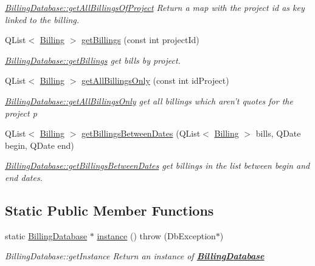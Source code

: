 \begin{DoxyCompactItemize}
\begin{DoxyCompactList}\small\item\em \hyperlink{classDatabases_1_1BillingDatabase_a44c3e09fbb7d540579f4cceae4d6901f}{Billing\-Database\-::get\-All\-Billings\-Of\-Project} Return a map with the project id as key linked to the billing. \end{DoxyCompactList}\item 
Q\-List$<$ \hyperlink{classModels_1_1Billing}{Billing} $>$ \hyperlink{classDatabases_1_1BillingDatabase_a0eb72e4dfee0ff38f2f4b795a16007c8}{get\-Billings} (const int project\-Id)
\begin{DoxyCompactList}\small\item\em \hyperlink{classDatabases_1_1BillingDatabase_a0eb72e4dfee0ff38f2f4b795a16007c8}{Billing\-Database\-::get\-Billings} get bills by project. \end{DoxyCompactList}\item 
Q\-List$<$ \hyperlink{classModels_1_1Billing}{Billing} $>$ \hyperlink{classDatabases_1_1BillingDatabase_ac42335646086c24b2adb6afc2829e07c}{get\-All\-Billings\-Only} (const int id\-Project)
\begin{DoxyCompactList}\small\item\em \hyperlink{classDatabases_1_1BillingDatabase_ac42335646086c24b2adb6afc2829e07c}{Billing\-Database\-::get\-All\-Billings\-Only} get all billings which aren't quotes for the project {\itshape p} \end{DoxyCompactList}\item 
Q\-List$<$ \hyperlink{classModels_1_1Billing}{Billing} $>$ \hyperlink{classDatabases_1_1BillingDatabase_a766bf07563179677656f75beb0efb5ef}{get\-Billings\-Between\-Dates} (Q\-List$<$ \hyperlink{classModels_1_1Billing}{Billing} $>$ bills, Q\-Date begin, Q\-Date end)
\begin{DoxyCompactList}\small\item\em \hyperlink{classDatabases_1_1BillingDatabase_a766bf07563179677656f75beb0efb5ef}{Billing\-Database\-::get\-Billings\-Between\-Dates} get billings in the list between {\itshape begin} and {\itshape end} dates. \end{DoxyCompactList}\end{DoxyCompactItemize}
\subsection*{Static Public Member Functions}
\begin{DoxyCompactItemize}
\item 
static \hyperlink{classDatabases_1_1BillingDatabase}{Billing\-Database} $\ast$ \hyperlink{classDatabases_1_1BillingDatabase_aee84d7d07ff4a25251c61030019e5abb}{instance} ()  throw (\-Db\-Exception$\ast$)
\begin{DoxyCompactList}\small\item\em Billing\-Database\-::get\-Instance Return an instance of {\bfseries \hyperlink{classDatabases_1_1BillingDatabase}{Billing\-Database}} \end{DoxyCompactList}\end{DoxyCompactItemize}
